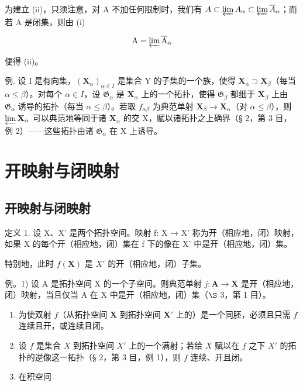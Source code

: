 为建立 (ii)，只须注意，对 A 不加任何限制时，我们有 \(A \subset \varprojlim A_{\alpha} \subset \varprojlim \overline{A}_{\alpha}\)；而若 A 是闭集，则由 (i)

\[
\mathrm{A} = \varprojlim \overline {{\mathrm{A}}} _ {\alpha}
\]

便得 (ii)。

例. 设 I 是有向集，\((\mathbf{X}_{\alpha})_{\alpha \in I}\) 是集合 Y 的子集的一个族，使得 \(\mathbf{X}_{\alpha} \supset \mathbf{X}_{\beta}\)（每当 \(\alpha \leqslant \beta\)）。对每个 \(\alpha \in I\)，设 \(\mathfrak{G}_{\alpha}\) 是 \(\mathbf{X}_{\alpha}\) 上的一个拓扑，使得 \(\mathfrak{G}_{\beta}\) 都细于 \(\mathbf{X}_{\beta}\) 上由 \(\mathfrak{G}_{\alpha}\) 诱导的拓扑（每当 \(\alpha \leqslant \beta\)）。若取 \(f_{\alpha \beta}\) 为典范单射 \(\mathbf{X}_{\beta} \to \mathbf{X}_{\alpha}\)（对 \(\alpha \leqslant \beta\)），则 \(\varprojlim \mathbf{X}_{\alpha}\) 可以典范地等同于诸 \(\mathbf{X}_{\alpha}\) 的交 X，赋以诸拓扑之上确界（§ 2，第 3 目，例 2）——这些拓扑由诸 \(\mathfrak{G}_{\alpha}\) 在 X 上诱导。

\section{开映射与闭映射}

\subsection{开映射与闭映射}

定义 1. 设 X、X' 是两个拓扑空间。映射 f: X → X' 称为开（相应地，闭）映射，如果 X 的每个开（相应地，闭）集在 f 下的像在 X' 中是开（相应地，闭）集。

特别地，此时 \(f(\mathbf{X})\) 是 \(X'\) 的开（相应地，闭）子集。

例。1) 设 A 是拓扑空间 X 的一个子空间。则典范单射 \(j: \mathbf{A} \to \mathbf{X}\) 是开（相应地，闭）映射，当且仅当 A 在 X 中是开（相应地，闭）集（\(\S\) 3，第 1 目）。

\begin{enumerate}
\def\labelenumi{\arabic{enumi})}
\setcounter{enumi}{1}
\item
  为使双射 \(f\)（从拓扑空间 \(\mathbf{X}\) 到拓扑空间 \(\mathbf{X}'\) 上的）是一个同胚，必须且只需 \(f\) 连续且开，或连续且闭。
\item
  设 \(f\) 是集合 \(X\) 到拓扑空间 \(X'\) 上的一个满射；若给 \(X\) 赋以在 \(f\) 之下 \(X'\) 的拓扑的逆像这一拓扑（§ 2，第 3 目，例 1），则 \(f\) 连续、开且闭。
\item
  在积空间
\end{enumerate}

